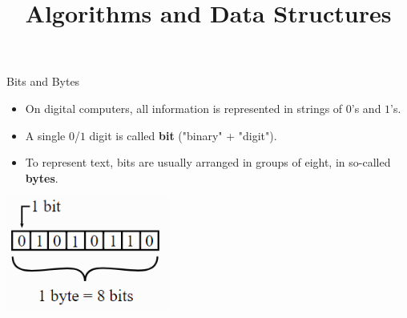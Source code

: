 \documentclass[11pt,compress,t,notes=noshow, xcolor=table]{beamer}
\title{Algorithms and Data Structures}
\begin{document}









\begin{vbframe}{Bits and Bytes}
\begin{itemize}
\item On digital computers, all information is represented in strings of $0$'s and $1$'s.
\item A single $0$/$1$ digit is called \textbf{bit} ("binary" + "digit").
\item To represent text, bits are usually arranged in groups of eight, in so-called \textbf{bytes}.
\end{itemize}

\begin{center}
\includegraphics[width=0.4\textwidth]{figure_man/bitbyte.png}
\end{center}


\end{vbframe}
\end{document}

